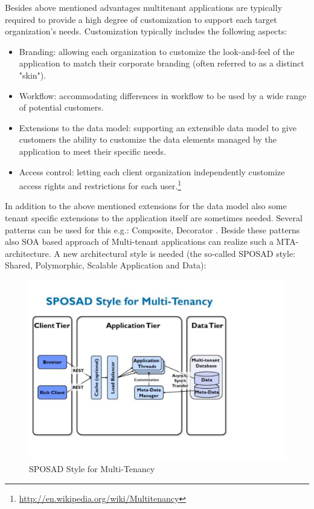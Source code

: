 \begin{center}
   
\end{center}

Besides above mentioned advantages multitenant applications are typically required to provide a high degree of customization to support each target organization's needs. Customization typically includes the following aspects:
\begin{itemize}
  \item Branding: allowing each organization to customize the look-and-feel of the application to match their corporate branding (often referred to as a distinct "skin").
	\item Workflow: accommodating differences in workflow to be used by a wide range of potential customers.
	\item Extensions to the data model: supporting an extensible data model to give customers the ability to customize the data elements managed by the application to meet their specific needs.
	\item Access control: letting each client organization independently customize access rights and restrictions for each user.\footnote{\url{http://en.wikipedia.org/wiki/Multitenancy}}
\end{itemize}

In addition to the above mentioned extensions for the data model also some tenant specific extensions to the application itself are sometimes needed. Several patterns can be used for this e.g.: {\sc Composite, Decorator} \cite{Gamma95}. Beside these patterns also SOA based approach of Multi-tenant applications can realize such a MTA-architecture.
A new architectural style is needed (the so-called SPOSAD style: Shared, Polymorphic, Scalable Application and Data):

\begin{figure}[h]
\centering
\includegraphics{patterns/Multi-tenantApplicationDiagram-01.pdf}
\caption{SPOSAD Style for Multi-Tenancy}
\label{fig:Multi-tenantApplicationDiagram-01}
\end{figure}

